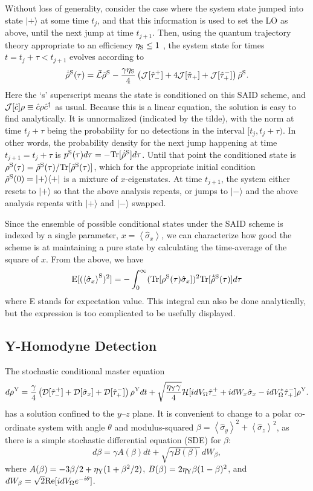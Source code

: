 \documentclass[12pt,prl,floatfix,showpacs,superscriptaddress,amsmath,amssymb]{revtex4}
\newcommand{\beq}{\begin{equation}}
\newcommand{\eeq}{\end{equation}}
\newcommand{\dg}{^\dagger}
\newcommand{\bra}[1]{\langle{#1}|}
\newcommand{\ket}[1]{|{#1}\rangle}
\newcommand{\op}[2]{\hat \tau_{#1}^{#2}}
\renewcommand{\(}{\left(}
\renewcommand{\)}{\right)}
\newcommand{\ro}[1]{\left( {#1} \right)}
\newcommand{\an}[1]{\left\langle{#1}\right\rangle}
\newcommand{\real}{\Re}
\renewcommand{\d}{^{\rm Y}}
\newcommand{\p}{^{\rm S}}
\newcommand{\s}[1]{\hat \sigma_{#1}}
\renewcommand{\Re}{{\rm Re}}
\begin{document}
{\begin{widetext}
Without loss of generality, consider the case where the system state jumped into state $\ket{+}$ at some time $t_j$, and that this information is used to set the LO as above, until the next jump at time $t_{j+1}$. 
 Then, using the quantum trajectory theory appropriate to an efficiency $\eta_{\rm S}\leq 1$ \cite{WisMil10}, 
 the system state for times $t=t_j+\tau < t_{j+1}$  evolves according to 
\beq \label{nospectraljumps}
\dot{\tilde\rho}\p(\tau) =  \bar{\cal L}\tilde \rho\p - \frac{\gamma\eta_{\rm S}}{4}
\ro{{\cal J}[\op-+] +    4{\cal J}[\hat\pi_+] + {\cal J}[\op+-]} \tilde\rho\p.
\eeq
Here the `s' superscript means the state is conditioned on this SAID scheme, 
and  ${\cal J}[\hat c]\rho \equiv \hat c\rho \hat c\dg$ as usual. Because this is a linear equation, the solution 
is easy to find analytically. 
It is unnormalized (indicated by the tilde), with the norm at time $t_j+\tau$ being the probability for no detections in the interval $[t_j,t_j+\tau)$. In other words, the probability density for the next jump happening at time $t_{j+1} = t_j+\tau$ is $p\p(\tau)d\tau = - {\rm Tr}[\dot{\tilde\rho}\p ] d\tau$. Until that point the conditioned state is $\rho\p(\tau) = {\tilde\rho}\p(\tau) / {\rm Tr}[{\tilde\rho}\p(\tau) ]$, which for the appropriate initial condition ${\tilde\rho}\p(0) = \ket{+}\bra{+}$ is a mixture of $x$-eigenstates. At time $t_{j+1}$, the system either resets to $\ket{+}$ so that the above analysis repeats, or jumps to $\ket{-}$ and the above analysis repeats with $\ket{+}$ and $\ket{-}$ swapped. 

Since the ensemble of possible conditional states under the SAID scheme is indexed by a single parameter, $x=\an{\s{x}}$, 
we can characterize how good the scheme is at maintaining a pure state by calculating the time-average of the square of $x$. 
From the above, we have
\beq \label{avxsq}
{\rm E}[(\an{\s{x}}\p)^2] = - \int_0^\infty  ({\rm Tr}[{\rho}\p(\tau) \s{x}])^2  {\rm Tr}[\dot{\tilde\rho}\p(\tau)] d\tau
\eeq
where E stands for expectation value. This integral can also be done analytically, but the expression is too complicated to be usefully displayed.


\subsection*{\large Y-Homodyne Detection}

The stochastic conditional master equation 
\beq
d\rho\d = \frac{\gamma}{4}\left( {\cal D}[\op-+] + {\cal D}[\s{x}] + {\cal D}[\op+-]\right) \rho\d dt +  \sqrt{\frac{\eta_{\rm Y}\gamma}{4}}{\cal H}[ idV_\Omega \op-+  + idW_x\s{x} - i dV_\Omega^* \op+- ] \rho\d . \label{sme-2}
\eeq
has a solution confined to the $y$--$z$ plane. It is convenient to change to a polar co-ordinate system with angle $\theta$ and modulus-squared $\beta=\an{\s{y}}^2+\an{\s{z}}^2$, as there is a simple stochastic differential equation (SDE) for $\beta$: 
\beq
d\beta = \gamma A(\beta)dt + \sqrt{\gamma B(\beta)}\,dW_\beta, \label{betaSDE}
\eeq
 where $A(\beta) = -3\beta/2 + \eta_{\rm Y}(1+\beta^2/2)$, $B(\beta) = 2\eta_{\rm Y}\beta(1-\beta)^2$, and 
 $dW_\beta = \sqrt{2}\real[idV_\Omega e^{-i\theta}]$. 
 

\end{widetext}}
\end{document}
